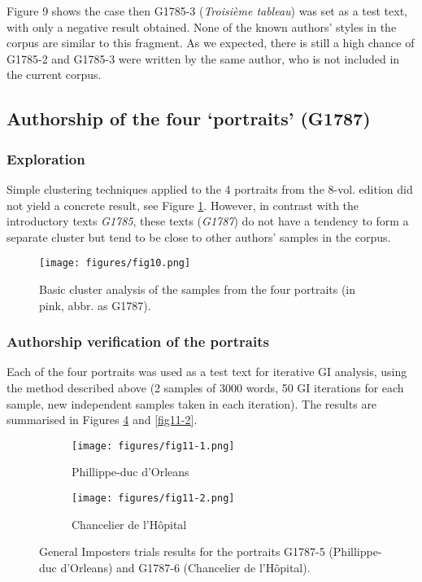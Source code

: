 \documentclass[12pt, letterpaper]{article}
\begin{document}
Figure 9 shows the case then G1785-3 (\emph{Troisième tableau}) was set as a test text, with only a negative result obtained. None of the known authors’ styles in the corpus are similar to this fragment. As we expected, there is still a high chance of G1785-2 and G1785-3 were written by the same author, who is not included in the current corpus.

\subsection{Authorship of the four `portraits' (G1787)}
\subsubsection{Exploration}
Simple clustering techniques applied to the 4 portraits from the 8-vol. edition did not yield a concrete result, see Figure \ref{fig10}. However, in contrast with the introductory texts \emph{G1785}, these texts (\emph{G1787}) do not have a tendency to form a separate cluster but tend to be close to other authors' samples in the corpus.

\begin{figure}
    \centering
    \texttt{[image: figures/fig10.png]}
    \caption{Basic cluster analysis of the samples from the four portraits (in pink, abbr. as G1787).}
    \label{fig10}
\end{figure}

\subsubsection{Authorship verification of the portraits}
Each of the four portraits was used as a test text for iterative GI analysis, using the method described above (2 samples of 3000 words, 50 GI iterations for each sample, new independent samples taken in each iteration). The results are summarised in Figures \ref{fig11-1} and \ref{fig11-2}.

\begin{figure}
\begin{subfigure}{.5\textwidth}
  \centering
  \texttt{[image: figures/fig11-1.png]}
  \caption{Phillippe-duc d'Orleans}
  \label{fig11:sub1}
\end{subfigure}
\begin{subfigure}{.5\textwidth}
  \centering
  \texttt{[image: figures/fig11-2.png]}
  \caption{Chancelier de l'Hôpital}
  \label{fig11:sub2}
\end{subfigure}
\caption{General Imposters trials results for the portraits G1787-5 (Phillippe-duc d'Orleans) and G1787-6 (Chancelier de l'Hôpital).}
\label{fig11-1}
\end{figure}
\end{document}
